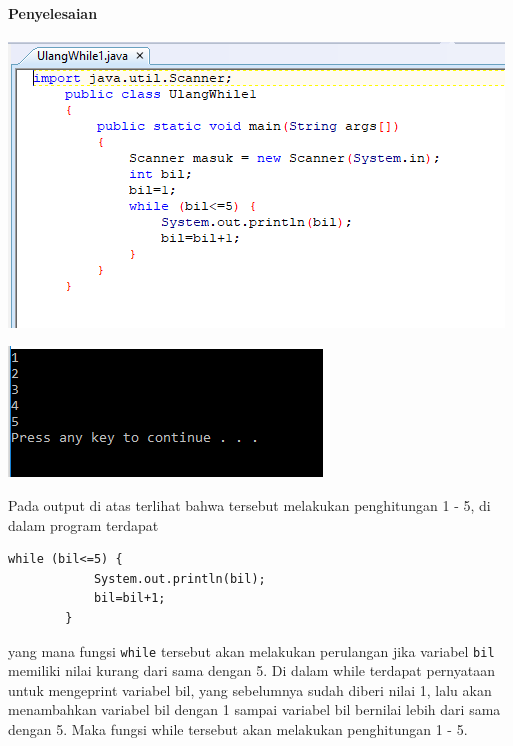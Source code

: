 \documentclass[a4paper,12pt]{article}
\begin{document}
\paragraph{Penyelesaian\\}
\begin{center}
\includegraphics[width=\linewidth]{Capture1}\\
\end{center}
\newpage
\begin{center}
 \includegraphics[scale=1]{Capture2}
\end{center}
Pada output di atas terlihat bahwa tersebut melakukan penghitungan 1 - 5, di dalam program terdapat
\begin{lstlisting}[frame=single]
while (bil<=5) {
            System.out.println(bil);
            bil=bil+1;
        }
\end{lstlisting}
yang mana fungsi \texttt{while} tersebut akan melakukan perulangan jika variabel \texttt{bil} memiliki nilai kurang dari sama dengan 5. Di dalam while terdapat pernyataan untuk mengeprint variabel bil, yang sebelumnya sudah diberi nilai 1, lalu akan menambahkan variabel bil dengan 1 sampai variabel bil bernilai lebih dari sama dengan 5. Maka fungsi while tersebut akan melakukan penghitungan 1 - 5.
\end{document}
